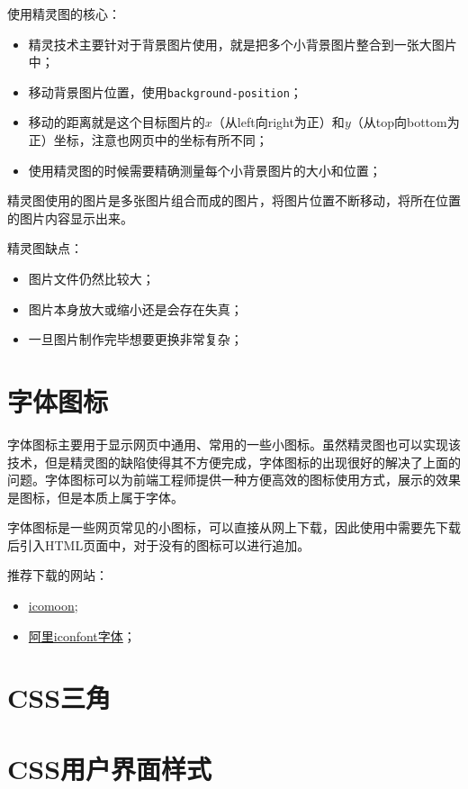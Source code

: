 使用精灵图的核心：
\begin{itemize}
    \item 精灵技术主要针对于背景图片使用，就是把多个小背景图片整合到一张大图片中；
    \item 移动背景图片位置，使用\verb|background-position|；
    \item 移动的距离就是这个目标图片的$x$（从left向right为正）和$y$（从top向bottom为正）坐标，注意也网页中的坐标有所不同；
    \item 使用精灵图的时候需要精确测量每个小背景图片的大小和位置；
\end{itemize}

精灵图使用的图片是多张图片组合而成的图片，将图片位置不断移动，将所在位置的图片内容显示出来。

精灵图缺点：
\begin{itemize}
    \item 图片文件仍然比较大；
    \item 图片本身放大或缩小还是会存在失真；
    \item 一旦图片制作完毕想要更换非常复杂；
\end{itemize}
\section{字体图标}
字体图标主要用于显示网页中通用、常用的一些小图标。虽然精灵图也可以实现该技术，但是精灵图的缺陷使得其不方便完成，字体图标的出现很好的解决了上面的问题。字体图标可以为前端工程师提供一种方便高效的图标使用方式，展示的效果是图标，但是本质上属于字体。

字体图标是一些网页常见的小图标，可以直接从网上下载，因此使用中需要先下载后引入HTML页面中，对于没有的图标可以进行追加。

推荐下载的网站：
\begin{itemize}
    \item \href{http://icomoon.io}{icomoon};
    \item \href{http://www.iconfont.cn/}{阿里iconfont字体}；
\end{itemize}
\section{CSS三角}
\section{CSS用户界面样式}
\section{}
